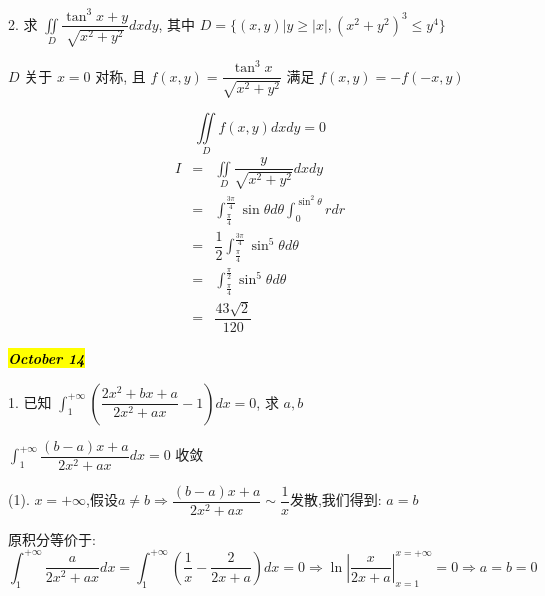 2. 求 $\displaystyle{\iint\limits_{D}\dfrac{\tan^3x+y}{\sqrt{x^2+y^2}}dxdy}$, 其中 $D=\{(x,y)|y\geq |x|,(x^2+y^2)^3\leq y^4\}$

\begin{solution}
	$D$ 关于 $x = 0$ 对称, 且 $f(x,y) = \dfrac{\tan^{3}x}{\sqrt{x^{2}+y^{2}}}$ 满足 $f(x,y) = -f(-x,y)$
	
	$$\displaystyle{\iint\limits_{D}f(x,y)dxdy} = 0$$  
	\begin{eqnarray*}
		I & = & \iint\limits_{D}\dfrac{y}{\sqrt{x^2+y^2}}dxdy\\
		  & = & \int_{\frac{\pi}{4}}^{\frac{3\pi}{4}}\sin\theta d\theta\int_{0}^{\sin^{2}\theta}r dr\\
		  & = & \dfrac{1}{2}\int_{\frac{\pi}{4}}^{\frac{3\pi}{4}}\sin^5\theta d\theta\\
		  & = & \int_{\frac{\pi}{4}}^{\frac{\pi}{2}}\sin^5\theta d\theta\\
		  & = & \dfrac{43\sqrt{2}}{120}
	\end{eqnarray*}
\end{solution}

\hl{\textbf{\textit{October 14}}}

1. 已知 $\displaystyle{\int_{1}^{+\infty}\left( \dfrac{2x^2+bx+a}{2x^2+ax}-1\right)dx=0}$, 求 $a,b$

\begin{solution}

	$\displaystyle{\int_{1}^{+\infty}\dfrac{(b-a)x+a}{2x^2+ax}dx=0}$ 收敛
	
	(1). $x=+\infty$,假设$a\neq b\Rightarrow \dfrac{(b-a)x+a}{2x^2+ax}\sim \dfrac{1}{x}\text{发散}$,我们得到:  $a=b$
	
	原积分等价于:  $$\int_{1}^{+\infty}\dfrac{a}{2x^2+ax}dx=\int_{1}^{+\infty}(\dfrac{1}{x}-\dfrac{2}{2x+a})dx=0\Rightarrow \ln|\dfrac{x}{2x+a}|_{x=1}^{x=+\infty}=0\Rightarrow a=b=0$$
\end{solution}

